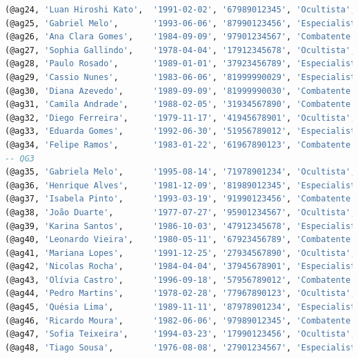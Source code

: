 \documentclass[12pt,a4paper]{report}
\begin{document}
\begin{lstlisting}[language=SQL, caption=population.sql]
(@ag24, 'Luan Hiroshi Kato',  '1991-02-02', '67989012345', 'Ocultista',   'Veterano', 61, FALSE, FALSE),
(@ag25, 'Gabriel Melo',       '1993-06-06', '87990123456', 'Especialista','Elite',    48, FALSE, FALSE), -- VER 2
(@ag26, 'Ana Clara Gomes',    '1984-09-09', '97901234567', 'Combatente',  'Veterano', 59, FALSE, FALSE),
(@ag27, 'Sophia Gallindo',    '1978-04-04', '17912345678', 'Ocultista',   'Elite',    67, FALSE, FALSE),
(@ag28, 'Paulo Rosado',       '1989-01-01', '37923456789', 'Especialista','Veterano', 64, FALSE, FALSE),
(@ag29, 'Cassio Nunes',       '1983-06-06', '81999990029', 'Especialista','Elite',    82, FALSE, TRUE),
(@ag30, 'Diana Azevedo',      '1989-09-09', '81999990030', 'Combatente',  'Veterano', 57, FALSE, FALSE),
(@ag31, 'Camila Andrade',     '1988-02-05', '31934567890', 'Combatente',  'Elite',    95, FALSE, FALSE),
(@ag32, 'Diego Ferreira',     '1979-11-17', '41945678901', 'Ocultista',   'Veterano', 60, FALSE, FALSE),
(@ag33, 'Eduarda Gomes',      '1992-06-30', '51956789012', 'Especialista','Recruta',  20, FALSE, FALSE),
(@ag34, 'Felipe Ramos',       '1983-01-22', '61967890123', 'Combatente',  'Veterano', 50, FALSE, TRUE),
-- QG3
(@ag35, 'Gabriela Melo',      '1995-08-14', '71978901234', 'Ocultista',   'Elite',    88, FALSE, FALSE),
(@ag36, 'Henrique Alves',     '1981-12-09', '81989012345', 'Especialista','Veterano', 65, FALSE, FALSE),
(@ag37, 'Isabela Pinto',      '1993-03-19', '91990123456', 'Combatente',  'Recruta',  25, FALSE, FALSE),
(@ag38, 'João Duarte',        '1977-07-27', '95901234567', 'Ocultista',   'Veterano', 55, FALSE, FALSE),
(@ag39, 'Karina Santos',      '1986-10-03', '47912345678', 'Especialista','Elite',    92, FALSE, FALSE),
(@ag40, 'Leonardo Vieira',    '1980-05-11', '67923456789', 'Combatente',  'Veterano', 58, FALSE, FALSE),
(@ag41, 'Mariana Lopes',      '1991-12-25', '27934567890', 'Ocultista',   'Recruta',  35, FALSE, FALSE),
(@ag42, 'Nicolas Rocha',      '1984-04-04', '37945678901', 'Especialista','Veterano', 63, FALSE, FALSE),
(@ag43, 'Olívia Castro',      '1996-09-18', '57956789012', 'Combatente',  'Elite',    99, TRUE, FALSE),
(@ag44, 'Pedro Martins',      '1978-02-28', '77967890123', 'Ocultista',   'Veterano', 68, FALSE, FALSE),
(@ag45, 'Quésia Lima',        '1989-11-11', '87978901234', 'Especialista','Recruta',  22, FALSE, FALSE),
(@ag46, 'Ricardo Moura',      '1982-06-06', '97989012345', 'Combatente',  'Veterano', 57, FALSE, FALSE),
(@ag47, 'Sofia Teixeira',     '1994-03-23', '17990123456', 'Ocultista',   'Elite',    94, FALSE, FALSE),
(@ag48, 'Tiago Sousa',        '1976-08-08', '27901234567', 'Especialista','Veterano', 66, FALSE, FALSE),

\end{lstlisting}
\end{document}
